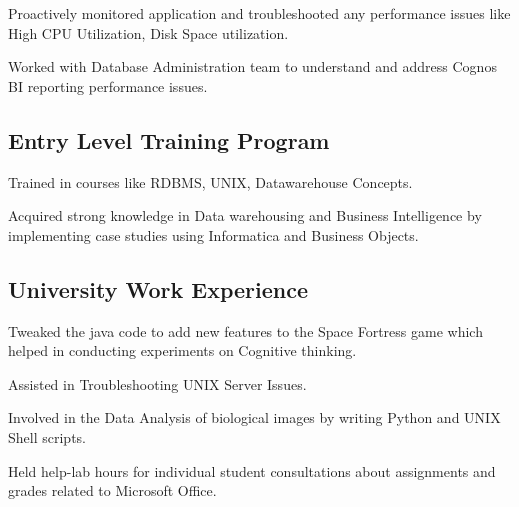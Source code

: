 \documentclass[]{deedy-resume-openfont}
\begin{document}
{\begin{minipage}[t]{0.64\textwidth}
\begin{mdframed}[hidealllines=true,backgroundcolor=gray!5]
\begin{tightemize}
\item Proactively monitored application and troubleshooted any performance issues like High CPU Utilization, Disk Space utilization.

\item Worked with Database Administration team to understand and address Cognos BI reporting performance issues.

\end{tightemize}
\end{mdframed}
\vspace{-1.26em}
\begin{mdframed}[hidealllines=true,backgroundcolor=gray!5]
\section{Entry Level Training Program}

\begin{tightemize}
\item Trained in courses like RDBMS, UNIX, Datawarehouse Concepts.
\item Acquired strong knowledge in Data warehousing and Business Intelligence by implementing case studies using Informatica and Business Objects.
\end{tightemize}
\end{mdframed}
\vspace{-1.26em}
\begin{mdframed}[hidealllines=true,backgroundcolor=gray!5]
\section{University Work Experience}
\begin{tightemize}
\item Tweaked the java code to add new features to the Space Fortress game which helped in conducting experiments on Cognitive thinking.

\item Assisted in Troubleshooting UNIX Server Issues.

\item Involved in the Data Analysis of biological images by writing Python and UNIX Shell scripts.

\item Held help-lab hours for individual student consultations about assignments and grades related to Microsoft Office.

\end{tightemize}
\end{mdframed}



\end{minipage} }
\end{document}
